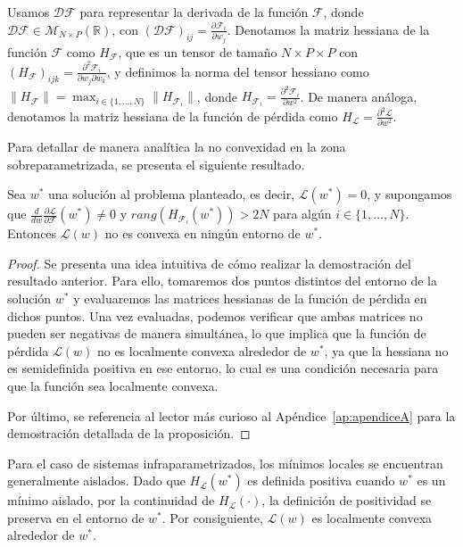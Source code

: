 Usamos $\mathcal{DF}$ para representar la derivada de la función $\mathcal{F}$, donde $\mathcal{DF} \in \mathcal{M}_{N \times P}(\mathbb{R})$, con $(\mathcal{DF})_{ij} = \frac{\partial \mathcal{F}_{i}}{\partial w_j}$. Denotamos la matriz hessiana de la función $\mathcal{F}$ como $H_{\mathcal{F}}$, que es un tensor de tamaño $N \times P \times P$ con $(H_{\mathcal{F}})_{ijk} = \frac{\partial^2 \mathcal{F}_{i}}{\partial w_j \partial w_k}$, y definimos la norma del tensor hessiano como $\| H_{\mathcal{F}} \| = \max_{i \in \{1, \ldots,N \}} \| H_{\mathcal{F}_{i}} \|$, donde $H_{\mathcal{F}_{i}} = \frac{\partial^2 \mathcal{F}_{i}}{\partial w^2}$. De manera análoga, denotamos la matriz hessiana de la función de pérdida como $H_{\mathcal{L}} = \frac{\partial^2 \mathcal{L}}{\partial w^2}$.

Para detallar de manera analítica la no convexidad en la zona sobreparametrizada, se presenta el siguiente resultado.

\begin{proposicion}\label{prop:non-conexity}
    Sea $w^{*}$ una solución al problema planteado, es decir, $\mathcal{L}(w^{*}) = 0$, y supongamos que $\frac{d}{dw}\frac{\partial \mathcal{L}}{\partial \mathcal{F}}(w^{*}) \neq 0$ y $rang(H_{\mathcal{F}_{i}}(w^{*})) > 2N$ para algún $i \in \{1, \ldots, N \}$. Entonces $\mathcal{L}(w)$ no es convexa en ningún entorno de $w^{*}$.
\end{proposicion}

\begin{proof}
    Se presenta una idea intuitiva de cómo realizar la demostración del resultado anterior. Para ello, tomaremos dos puntos distintos del entorno de la solución $w^*$ y evaluaremos las matrices hessianas de la función de pérdida en dichos puntos. Una vez evaluadas, podemos verificar que ambas matrices no pueden ser negativas de manera simultánea, lo que implica que la función de pérdida $\mathcal{L}(w)$ no es localmente convexa alrededor de $w^*$, ya que la hessiana no es semidefinida positiva en ese entorno, lo cual es una condición necesaria para que la función sea localmente convexa.

    Por último, se referencia al lector más curioso al Apéndice~\ref{ap:apendiceA} para la demostración detallada de la proposición.
\end{proof}

Para el caso de sistemas infraparametrizados, los mínimos locales se encuentran generalmente aislados. Dado que $H_{\mathcal{L}}(w^{*})$ es definida positiva cuando $w^{*}$ es un mínimo aislado, por la continuidad de $H_{\mathcal{L}}(\cdot)$, la definición de positividad se preserva en el entorno de $w^{*}$. Por consiguiente, $\mathcal{L}(w)$ es localmente convexa alrededor de $w^{*}$.

